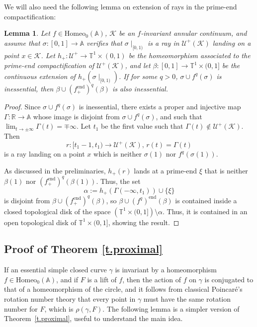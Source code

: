 \documentclass[12pt,a4paper]{amsart}
\newtheorem{lemma}[thm]{Lemma}
\theoremstyle{definition}
\theoremstyle{remark}
\newcommand{\T}{\mathbb{T}}
\newcommand{\R}{\mathbb{R}}
\newcommand{\A}{\mathbb{A}}
\begin{document}
We will also need the following lemma on extension of rays in the prime-end compactification:
\begin{lemma}\label{stilline}
Let $f\in\mathrm{Homeo}_0(\A)$, $\mathcal{K}$ be an $f$-invariant annular continuum, and assume that $\sigma:[0,1]\to \A$ verifies that $\sigma\mid_{[0,1)}$ is a ray in $\mathcal{U}^{+}(\mathcal{K})$ landing on a point $x\in\mathcal{K}$. Let $h_{+}:\mathcal{U}^{+}\to\T^1\times(0,1)$ be the homeomorphism associated to the  prime-end compactification of $\mathcal{U}^{+}(\mathcal{K})$, and let $\beta:[0,1]\to\T^1\times(0,1]$ be  the continuous extension of $h_+(\sigma\mid_{[0,1)})$.  If for some $q>0$, $\sigma\cup f^q(\sigma)$ is inessential, then $\beta\cup (f^{\mathrm{end}}_{+})^q(\beta)$ is also inessential.
\end{lemma}
\begin{proof}


Since $\sigma\cup f^q(\sigma)$ is inessential, there exists a proper and injective map $\Gamma:\R\to\A$ whose image is disjoint from $\sigma \cup f^q(\sigma)$, and such that $\lim_{t\to\pm \infty}\Gamma(t)=\mp \infty$. Let $t_1$ be the first value such that $\Gamma(t)\notin \mathcal{U}^{+}(\mathcal{K})$. Then 
$$r:[t_1-1,t_1)\to \mathcal{U}^{+}(\mathcal{K}),\, r(t)=\Gamma(t)$$ is a ray landing on a point $x$ which is neither 
$\sigma(1)$ nor $f^q(\sigma(1))$. 

As discussed in the preliminaries, $h_+(r)$ lands at a prime-end $\xi$ that is neither $\beta(1)$ nor $(f^{\mathrm{end}}_+)^q(\beta(1))$. Thus, the set 
$$\alpha:=h_+(\Gamma(-\infty,t_1)) \cup \{\xi\}$$
is disjoint from $\beta \cup (f^{\mathrm{end}}_+)^q(\beta)$, so 
$\beta \cup (f^q)^{\mathrm{end}}(\beta)$ is contained inside a closed topological disk
of the space $\left(\T^1\times(0,1]\right)\setminus\alpha$. Thus, it is contained in an open topological disk of $\T^1\times(0,1]$, showing the result.
\end{proof}

\subsection{Proof of Theorem \ref{t.proximal}}\label{sub.3.1}

If an essential simple closed curve $\gamma$ is invariant by a  homeomorphism $f\in\mathrm{Homeo}_0(\A)$, and if $F$ is a lift of $f$, then the action of $f$ on $\gamma$ is conjugated to that of a homeomorphism of the circle, and it follows from classical Poincar\'e's rotation number theory that every point in $\gamma$ must have the same rotation number for $F$, which is $\rho(\gamma, F)$. The following lemma is a simpler version of Theorem~\ref{t.proximal}, useful to understand the main idea.
\end{document}
